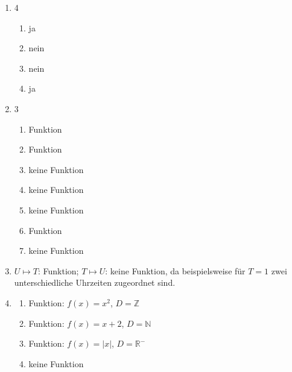 \begin{enumerate}

    \item
          \begin{multicols}{4}
              \begin{enumerate}
                  \item ja
                  \item nein
                  \item nein
                  \item ja
              \end{enumerate}
          \end{multicols}

    \item
          \begin{multicols}{3}
              \begin{enumerate}
                  \item Funktion
                  \item Funktion
                  \item keine Funktion
                  \item keine Funktion
                  \item keine Funktion %
                  \item Funktion
                  \item keine Funktion %
              \end{enumerate}
          \end{multicols}

    \item
          $U \mapsto T$: Funktion;
          $T \mapsto U$: keine Funktion, da beispielsweise für $T=1$
          zwei unterschiedliche Uhrzeiten zugeordnet sind.

    \item
          \begin{enumerate}
              \item Funktion: $f(x)=x^2$, $D=\mathbb{Z}$ %

              \item Funktion: $f(x)=x+2$, $D=\mathbb{N}$ %

              \item Funktion: $f(x)=|x|$, $D=\mathbb{R}^-$ %

              \item keine Funktion %


\end{enumerate}
\end{enumerate}

